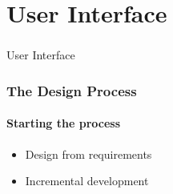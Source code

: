 \section[UI]{User Interface}

\begin{frame}
  \frametitle{}
  \begin{center}
    {\Huge User Interface}
  \end{center}
\end{frame}

\begin{frame}
    \frametitle{The Design Process}
    \framesubtitle{Starting the process}
    \begin{itemize}
    	\item Design from requirements
    	\item Incremental development
    \end{itemize}
\end{frame}

